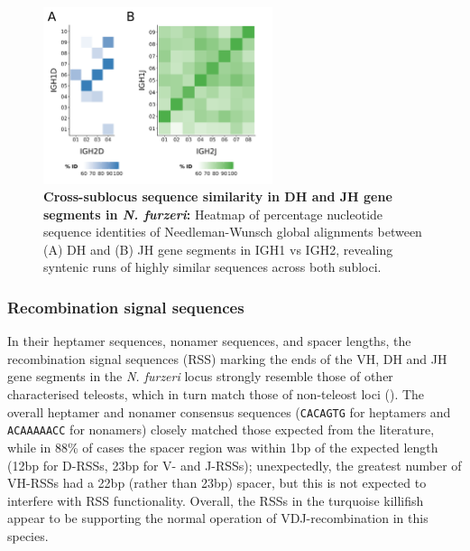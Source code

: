 
\begin{figure}
\centering
	\centering
	\begin{subfigure}{0em}
    \label{fig:nfu-dj-alignment-a}
    \end{subfigure}
    \begin{subfigure}{0em}
    \label{fig:nfu-dj-alignment-b}
    \end{subfigure}

\includegraphics[width=0.6\textwidth]{_Figures/png/nfu-dj-aln}
\caption[Cross-sublocus sequence similarity in DH and JH gene segments in \textit{N. furzeri}]{\textbf{Cross-sublocus sequence similarity in DH and JH gene segments in \textit{N. furzeri}:} Heatmap of percentage nucleotide sequence identities of Needleman-Wunsch global alignments between (A) DH and (B) JH gene segments in IGH1 vs IGH2, revealing syntenic runs of highly similar sequences across both subloci.}
\label{fig:nfu-dj-alignment}
\end{figure}

	\subsubsection{Recombination signal sequences}
	
	In their heptamer sequences, nonamer sequences, and spacer lengths, the recombination signal sequences (RSS) marking the ends of the VH, DH and JH gene segments in the \textit{N. furzeri} locus strongly resemble those of other characterised teleosts, which in turn match those of non-teleost loci (). The overall heptamer and nonamer consensus sequences (\texttt{CACAGTG} for heptamers and \texttt{ACAAAAACC} for nonamers) closely matched those expected from the literature, while in 88\% of cases the spacer region was within 1bp of the expected length (12bp for D-RSSs, 23bp for V- and J-RSSs); unexpectedly, the greatest number of VH-RSSs had a 22bp (rather than 23bp) spacer, but this is not expected to interfere with RSS functionality. Overall, the RSSs in the turquoise killifish appear to be supporting the normal operation of VDJ-recombination in this species.
	
